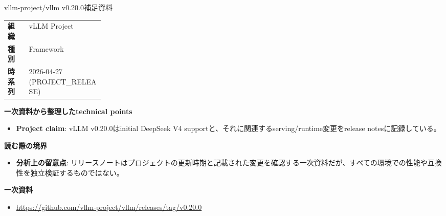 \begin{technicalnote}{vllm-project/vllm v0.20.0}{補足資料}
\begingroup
\begin{tabularx}{\linewidth}{@{}>{\bfseries}p{0.22\linewidth}X@{}}
組織 & vLLM Project \\
種別 & Framework \\
時系列 & 2026-04-27 (PROJECT\_RELEASE) \\
\end{tabularx}
\smallskip
{\bfseries 一次資料から整理したtechnical points}
\begin{itemize}[leftmargin=1.5em,itemsep=0.35em]
\item \textbf{Project claim}: vLLM v0.20.0はinitial DeepSeek V4 supportと、それに関連するserving/runtime変更をrelease notesに記録している。
\end{itemize}
{\bfseries 読む際の境界}
\begin{itemize}[leftmargin=1.5em,itemsep=0.35em]
\item \textbf{分析上の留意点}: リリースノートはプロジェクトの更新時期と記載された変更を確認する一次資料だが、すべての環境での性能や互換性を独立検証するものではない。
\end{itemize}
\begin{samepage}
{\bfseries 一次資料}
\begingroup\sloppy
\begin{itemize}[leftmargin=1.5em,itemsep=0.25em]
\item {\scriptsize\url{https://github.com/vllm-project/vllm/releases/tag/v0.20.0}}
\end{itemize}
\endgroup
\end{samepage}
\endgroup
\end{technicalnote}
\medskip
